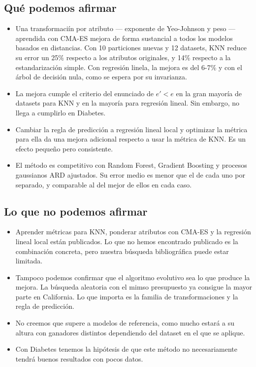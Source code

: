 \subsection{Qué podemos afirmar}
\begin{itemize}
    \item Una transformaciín por atributo --- exponente de Yeo-Johnson y peso --- aprendida con CMA-ES mejora de forma sustancial a todos los modelos basados en distancias. Con 10 particiones nuevas y 12 datasets, KNN reduce su error un 25\% respecto a los atributos originales, y 14\% respecto a la estandarización simple. Con regresión linela, la mejora es del 6-7\% y con el árbol de decisión nula, como se espera por su invarianza. 
    \item La mejora cumple el criterio del enunciado de $e'<e$ en la gran mayoría de datasets para KNN y en la mayoría para regresión lineal. Sin embargo, no llega a cumplirlo en Diabetes. 
    \item Cambiar la regla de predicción a regresión lineal local y optimizar la métrica para ella da una mejora adicional respecto a usar la métrica de KNN. Es un efecto pequeño pero consistente. 
    \item El método es competitivo con Random Forest, Gradient Boosting y procesos gaussianos ARD ajustados. Su error medio es menor que el de cada uno por separado, y comparable al del mejor de ellos en cada caso. 
\end{itemize}

\subsection{Lo que no podemos afirmar}
\begin{itemize}
    \item Aprender métricas para KNN, ponderar atributos con CMA-ES y la regresión lineal local están publicados. Lo que no hemos encontrado publicado es la combinación concreta, pero nuestra búsqueda bibliográfica puede estar limitada. 
    \item Tampoco podemos confirmar que el algoritmo evolutivo sea lo que produce la mejora. La búsqueda aleatoria con el mimso presupuesto ya consigue la mayor parte en California. Lo que importa es la familia de transformaciones y la regla de predicción. 
    \item No creemos que supere a modelos de referencia, como mucho estará a su altura con ganadores distintos dependiendo del dataset en el que se aplique. 
    \item Con Diabetes tenemos la hipótesis de que este método no necesariamente tendrá buenos resultados con pocos datos.
\end{itemize}

